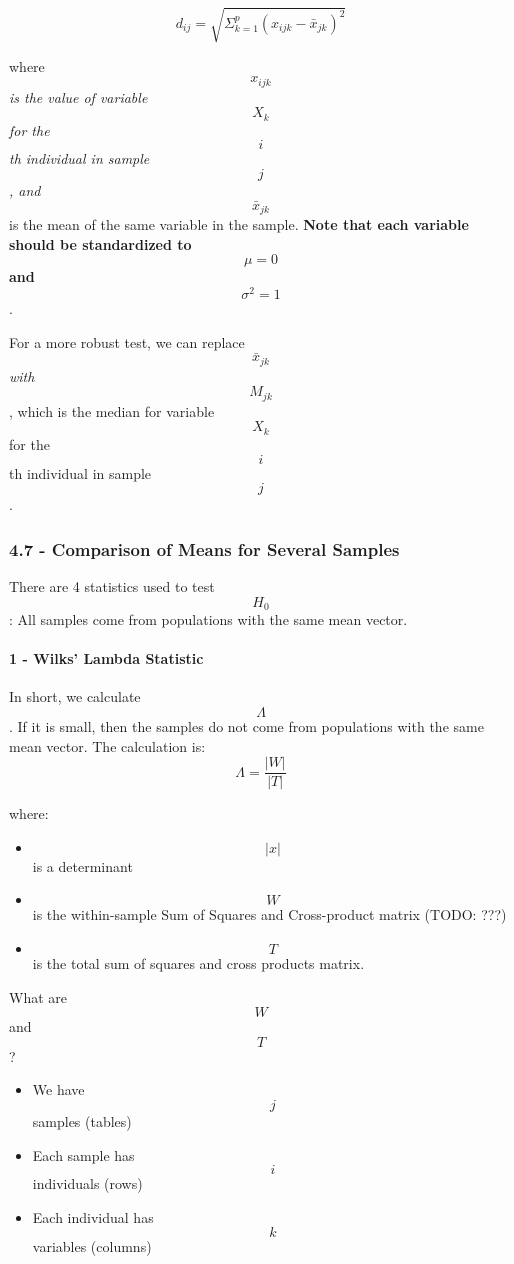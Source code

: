\documentclass[]{article}
\providecommand{\tightlist}{%
  \setlength{\itemsep}{0pt}\setlength{\parskip}{0pt}}
\let\oldparagraph\paragraph
\renewcommand{\paragraph}[1]{\oldparagraph{#1}\mbox{}}
\begin{document}
\[d_{ij} = \sqrt{\Sigma_{k = 1}^p (x_{ijk} - \bar{x}_{jk})^2}\]

where \[ x_{ijk} \] \emph{is the value of variable} \[X_k\] \emph{for
the} \[i\]\emph{th individual in sample} \[j\]\emph{, and}
\[\bar{x}_{jk}\] is the mean of the same variable in the sample.
\textbf{Note that each variable should be standardized to} \[\mu = 0\]
\textbf{and} \[\sigma^2 = 1\].

For a more robust test, we can replace \[\bar{x}_{jk}\] \emph{with}
\[ M_{jk} \], which is the median for variable \[X_k\] for the \[i\]th
individual in sample \[j\].

\hypertarget{comparison-of-means-for-several-samples}{%
\subsubsection{4.7 - Comparison of Means for Several
Samples}\label{comparison-of-means-for-several-samples}}

There are 4 statistics used to test \[H_0\]: All samples come from
populations with the same mean vector.

\hypertarget{wilks-lambda-statistic}{%
\paragraph{1 - Wilks' Lambda Statistic}\label{wilks-lambda-statistic}}

In short, we calculate \[\Lambda\]. If it is small, then the samples do
not come from populations with the same mean vector. The calculation is:
\[\Lambda = \frac{| W | }{| T |}\]

where:

\begin{itemize}
\tightlist
\item
  \[| x |\] is a determinant
\item
  \[W\] is the within-sample Sum of Squares and Cross-product matrix
  (TODO: ???)
\item
  \[T\] is the total sum of squares and cross products matrix.
\end{itemize}

What are \[W\] and \[T\]?

\begin{itemize}
\tightlist
\item
  We have \[j\] samples (tables)
\item
  Each sample has \[i\] individuals (rows)
\item
  Each individual has \[k\] variables (columns)
\end{itemize}
\end{document}
